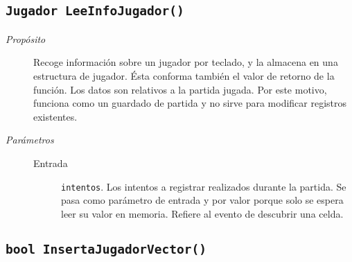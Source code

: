 \documentclass[12pt]{article}
\begin{document}
\subsection*{\texttt{Jugador LeeInfoJugador()}}

\begin{description}

\item[\emph{Propósito}]

Recoge información sobre un jugador por teclado, y la almacena en una estructura
de jugador. Ésta conforma también el valor de retorno de la función. Los datos
son relativos a la partida jugada. Por este motivo, funciona como un guardado de
partida y no sirve para modificar registros existentes.

\item[\emph{Parámetros}] \leavevmode

\begin{description}

\item[Entrada] \texttt{intentos}. Los intentos a registrar realizados
durante la partida. Se pasa como parámetro de entrada y por valor porque solo se
espera leer su valor en memoria. Refiere al evento de descubrir una celda.

\end{description}

\end{description}

\subsection*{\texttt{bool InsertaJugadorVector()}}
\end{document}
